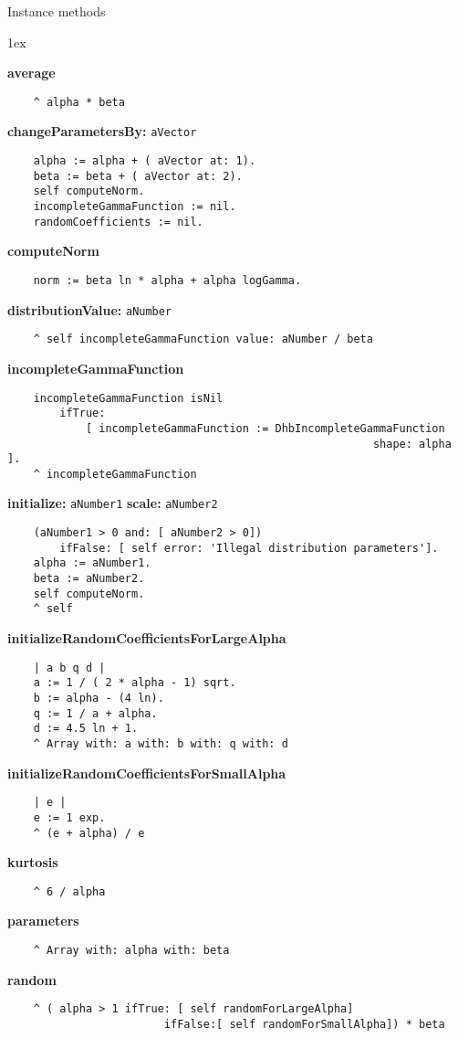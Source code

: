 Instance methods
{\parskip 1ex\par\noindent}
{\bf average}
\begin{verbatim}
    ^ alpha * beta
\end{verbatim}
{\bf changeParametersBy:} {\tt aVector}
\begin{verbatim}
    alpha := alpha + ( aVector at: 1).
    beta := beta + ( aVector at: 2).
    self computeNorm.
    incompleteGammaFunction := nil.
    randomCoefficients := nil.
\end{verbatim}
{\bf computeNorm}
\begin{verbatim}
    norm := beta ln * alpha + alpha logGamma.
\end{verbatim}
{\bf distributionValue:} {\tt aNumber}
\begin{verbatim}
    ^ self incompleteGammaFunction value: aNumber / beta
\end{verbatim}
{\bf incompleteGammaFunction}
\begin{verbatim}
    incompleteGammaFunction isNil 
        ifTrue: 
            [ incompleteGammaFunction := DhbIncompleteGammaFunction 
                                                        shape: alpha ].
    ^ incompleteGammaFunction
\end{verbatim}
{\bf initialize:} {\tt aNumber1} {\bf scale:} {\tt aNumber2}
\begin{verbatim}
    (aNumber1 > 0 and: [ aNumber2 > 0])
        ifFalse: [ self error: 'Illegal distribution parameters'].
    alpha := aNumber1.
    beta := aNumber2.
    self computeNorm.
    ^ self
\end{verbatim}
{\bf initializeRandomCoefficientsForLargeAlpha}
\begin{verbatim}
    | a b q d |
    a := 1 / ( 2 * alpha - 1) sqrt.
    b := alpha - (4 ln).
    q := 1 / a + alpha.
    d := 4.5 ln + 1.
    ^ Array with: a with: b with: q with: d
\end{verbatim}
{\bf initializeRandomCoefficientsForSmallAlpha}
\begin{verbatim}
    | e |
    e := 1 exp.
    ^ (e + alpha) / e
\end{verbatim}
{\bf kurtosis}
\begin{verbatim}
    ^ 6 / alpha
\end{verbatim}
{\bf parameters}
\begin{verbatim}
    ^ Array with: alpha with: beta
\end{verbatim}
{\bf random}
\begin{verbatim}
    ^ ( alpha > 1 ifTrue: [ self randomForLargeAlpha]
                        ifFalse:[ self randomForSmallAlpha]) * beta
\end{verbatim}
